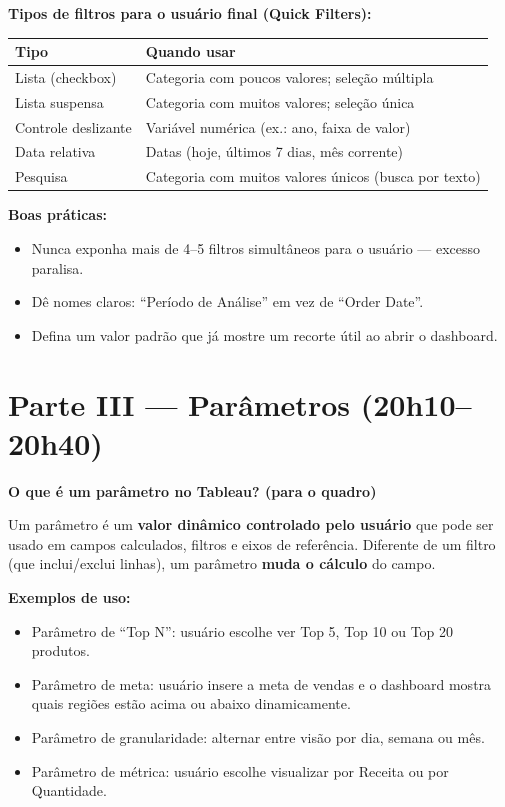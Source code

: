 \begin{SolvedBox}
\textbf{Tipos de filtros para o usuário final (Quick Filters):}

\begin{tabular}{|l|p{9cm}|}
\hline
\textbf{Tipo} & \textbf{Quando usar} \\
\hline
Lista (checkbox) & Categoria com poucos valores; seleção múltipla \\
Lista suspensa & Categoria com muitos valores; seleção única \\
Controle deslizante & Variável numérica (ex.: ano, faixa de valor) \\
Data relativa & Datas (hoje, últimos 7 dias, mês corrente) \\
Pesquisa & Categoria com muitos valores únicos (busca por texto) \\
\hline
\end{tabular}

\textbf{Boas práticas:}
\begin{itemize}
  \item Nunca exponha mais de 4–5 filtros simultâneos para o usuário — excesso paralisa.
  \item Dê nomes claros: ``Período de Análise'' em vez de ``Order Date''.
  \item Defina um valor padrão que já mostre um recorte útil ao abrir o dashboard.
\end{itemize}
\end{SolvedBox}

\section{Parte III — Parâmetros (20h10–20h40)}

\begin{BoardBox}
\textbf{O que é um parâmetro no Tableau? (para o quadro)}

Um parâmetro é um \textbf{valor dinâmico controlado pelo usuário} que pode ser
usado em campos calculados, filtros e eixos de referência. Diferente de um filtro
(que inclui/exclui linhas), um parâmetro \textbf{muda o cálculo} do campo.

\textbf{Exemplos de uso:}
\begin{itemize}
  \item Parâmetro de ``Top N'': usuário escolhe ver Top 5, Top 10 ou Top 20 produtos.
  \item Parâmetro de meta: usuário insere a meta de vendas e o dashboard mostra quais
  regiões estão acima ou abaixo dinamicamente.
  \item Parâmetro de granularidade: alternar entre visão por dia, semana ou mês.
  \item Parâmetro de métrica: usuário escolhe visualizar por Receita ou por Quantidade.
\end{itemize}
\end{BoardBox}

